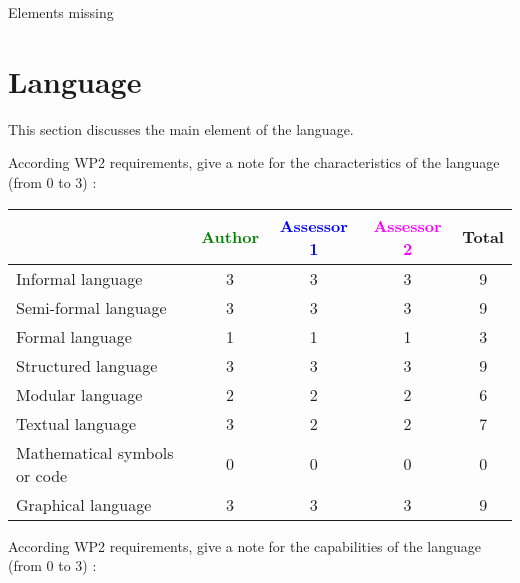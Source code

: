 \begin{assessor2}
Elements missing
\end{assessor2}


\section{Language}
This section discusses the main element of the language.

According WP2 requirements, give a note for the characteristics of the language (from 0 to 3) :

\begin{tabular}{|l | c | c | c | c|}
\hline
& \textcolor{green}{Author} & \textcolor{blue}{Assessor 1} & \textcolor{magenta}{Assessor 2} & Total \\
\hline
Informal language & 3 & 3 & 3 & 9 \\
\hline
Semi-formal language & 3 & 3 & 3 & 9 \\
\hline
Formal language & 1 & 1 & 1 & 3 \\
\hline
Structured language & 3 & 3 & 3 & 9 \\
\hline
Modular language & 2 & 2 & 2 & 6 \\
\hline
Textual language & 3 & 2 & 2 & 7 \\
\hline
Mathematical symbols or code & 0 & 0 & 0  & 0 \\
\hline
Graphical language & 3 & 3 & 3 & 9 \\
\hline
\end{tabular}

According WP2 requirements, give a note for the capabilities of the language (from 0 to 3) :

